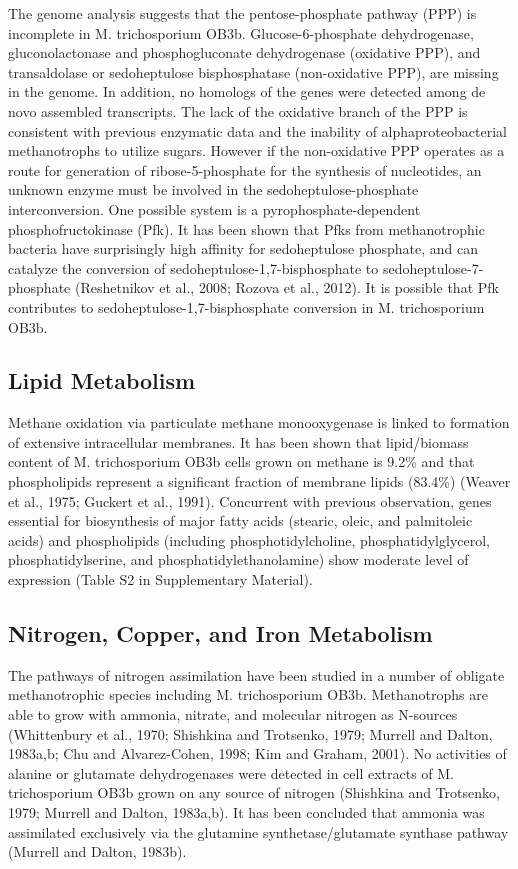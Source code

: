 The genome analysis suggests that the pentose-phosphate pathway (PPP) is incomplete in M. trichosporium OB3b.
Glucose-6-phosphate dehydrogenase, gluconolactonase and phosphogluconate dehydrogenase (oxidative PPP), and transaldolase or sedoheptulose bisphosphatase (non-oxidative PPP), are missing in the genome.
In addition, no homologs of the genes were detected among de novo assembled transcripts.
The lack of the oxidative branch of the PPP is consistent with previous enzymatic data and the inability of alphaproteobacterial methanotrophs to utilize sugars.
However if the non-oxidative PPP operates as a route for generation of ribose-5-phosphate for the synthesis of nucleotides, an unknown enzyme must be involved in the sedoheptulose-phosphate interconversion.
One possible system is a pyrophosphate-dependent phosphofructokinase (Pfk).
It has been shown that Pfks from methanotrophic bacteria have surprisingly high affinity for sedoheptulose phosphate, and can catalyze the conversion of sedoheptulose-1,7-bisphosphate to sedoheptulose-7-phosphate (Reshetnikov et al., 2008; Rozova et al., 2012).
It is possible that Pfk contributes to sedoheptulose-1,7-bisphosphate conversion in M. trichosporium OB3b.

\subsection{Lipid Metabolism}
Methane oxidation via particulate methane monooxygenase is linked to formation of extensive intracellular membranes.
It has been shown that lipid/biomass content of M. trichosporium OB3b cells grown on methane is 9.2\% and that phospholipids represent a significant fraction of membrane lipids (83.4\%) (Weaver et al., 1975; Guckert et al., 1991).
Concurrent with previous observation, genes essential for biosynthesis of major fatty acids (stearic, oleic, and palmitoleic acids) and phospholipids (including phosphotidylcholine, phosphatidylglycerol, phosphatidylserine, and phosphatidylethanolamine) show moderate level of expression (Table S2 in Supplementary Material).

\subsection{Nitrogen, Copper, and Iron Metabolism}
The pathways of nitrogen assimilation have been studied in a number of obligate methanotrophic species including M. trichosporium OB3b.
Methanotrophs are able to grow with ammonia, nitrate, and molecular nitrogen as N-sources (Whittenbury et al., 1970; Shishkina and Trotsenko, 1979; Murrell and Dalton, 1983a,b; Chu and Alvarez-Cohen, 1998; Kim and Graham, 2001).
No activities of alanine or glutamate dehydrogenases were detected in cell extracts of M. trichosporium OB3b grown on any source of nitrogen (Shishkina and Trotsenko, 1979; Murrell and Dalton, 1983a,b).
It has been concluded that ammonia was assimilated exclusively via the glutamine synthetase/glutamate synthase pathway (Murrell and Dalton, 1983b).

